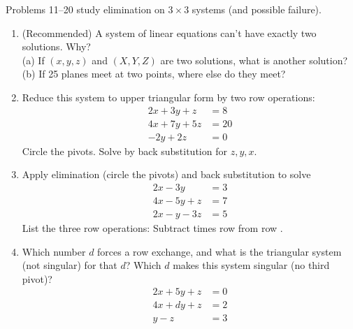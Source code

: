 \documentclass[14pt, a4paper]{article}
\begin{document}
\noindent Problems 11--20 study elimination on $3 \times 3$ systems (and possible failure).

\begin{enumerate}[resume]
    \item (Recommended) A system of linear equations can't have exactly two solutions. Why? \\
          (a) If $(x,y,z)$ and $(X,Y,Z)$ are two solutions, what is another solution? \\
          (b) If 25 planes meet at two points, where else do they meet?

    \item Reduce this system to upper triangular form by two row operations:
          \[
              \begin{aligned}
                  2x + 3y + z  & = 8  \\
                  4x + 7y + 5z & = 20 \\
                  -2y + 2z     & = 0
              \end{aligned}
          \]
          Circle the pivots. Solve by back substitution for $z, y, x$.

    \item Apply elimination (circle the pivots) and back substitution to solve
          \[
              \begin{aligned}
                  2x - 3y \phantom{{}+z} & = 3 \\
                  4x - 5y + z            & = 7 \\
                  2x - y - 3z            & = 5
              \end{aligned}
          \]
          List the three row operations: Subtract \underline{\hspace{2em}} times row \underline{\hspace{2em}} from row \underline{\hspace{2em}}.

    \item Which number $d$ forces a row exchange, and what is the triangular system (not singular) for that $d$? Which $d$ makes this system singular (no third pivot)?
          \[
              \begin{aligned}
                  2x + 5y + z & = 0 \\
                  4x + dy + z & = 2 \\
                  y - z       & = 3
              \end{aligned}
          \]


\end{enumerate}
\end{document}
